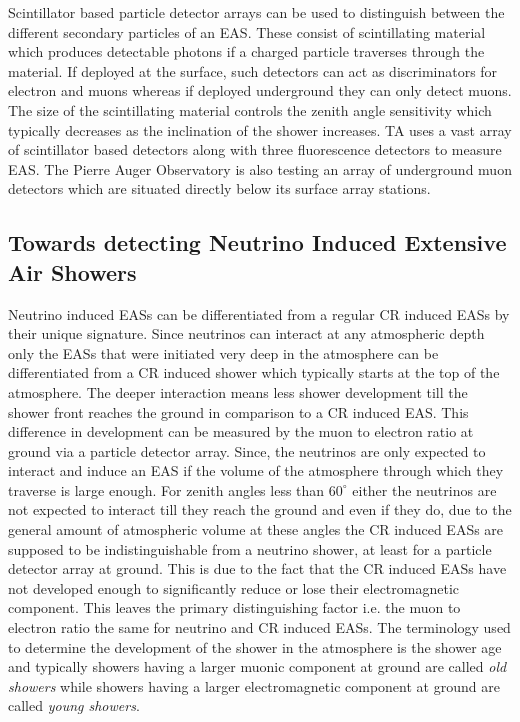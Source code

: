 Scintillator based particle detector arrays can be used to distinguish between the different secondary particles of an EAS. These consist of scintillating material which produces detectable photons if a charged particle traverses through the material. If deployed at the surface, such detectors can act as discriminators for electron and muons whereas if deployed underground they can only detect muons. The size of the scintillating material controls the zenith angle sensitivity which typically decreases as the inclination of the shower increases. TA uses a vast array of scintillator based detectors along with three fluorescence detectors to measure EAS. The Pierre Auger Observatory is also testing an array of underground muon detectors which are situated directly below its surface array stations.


\subsection{Towards detecting Neutrino Induced Extensive Air Showers}
\label{sec:EAS_nu}
Neutrino induced EASs can be differentiated from a regular CR induced EASs by their unique signature. Since neutrinos can interact at any atmospheric depth only the EASs that were initiated very deep in the atmosphere can be differentiated from a CR induced shower which typically starts at the top of the atmosphere. The deeper interaction means less shower development till the shower front reaches the ground in comparison to a CR induced EAS. This difference in development can be measured by the muon to electron ratio at ground via a particle detector array. Since, the neutrinos are only expected to interact and induce an EAS if the volume of the atmosphere through which they traverse is large enough. For zenith angles less than $60^{\circ}$ either the neutrinos are not expected to interact till they reach the ground and even if they do, due to the general amount of atmospheric volume at these angles the CR induced EASs are supposed to be indistinguishable from a neutrino shower, at least for a particle detector array at ground. This is due to the fact that the CR induced EASs have not developed enough to significantly reduce or lose their electromagnetic component. This leaves the primary distinguishing factor i.e. the muon to electron ratio the same for neutrino and CR induced EASs. The terminology used to determine the development of the shower in the atmosphere is the shower age and typically showers having a larger muonic component at ground are called \textit{old showers} while showers having a larger electromagnetic component at ground are called \textit{young showers}. 

